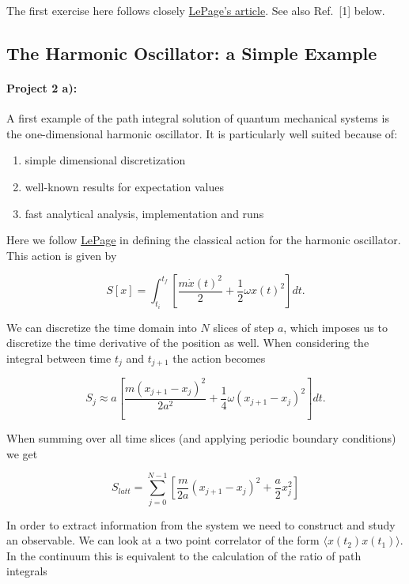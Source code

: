 \documentclass[%
oneside,                 %
final,                   %
10pt]{article}
\begin{document}
The first exercise here follows closely \href{{https://arxiv.org/pdf/hep-lat/0506036.pdf}}{LePage's article}. See also Ref.~[1] below.

\subsection*{The Harmonic Oscillator: a Simple Example}

\paragraph{Project 2 a):}
A first example of the path integral solution of quantum mechanical
systems is the one-dimensional harmonic oscillator. It is particularly
well suited because of:

\begin{enumerate}
\item simple dimensional discretization

\item well-known results for expectation values

\item fast analytical analysis, implementation and runs 
\end{enumerate}

\noindent
Here we follow \href{{https://arxiv.org/pdf/hep-lat/0506036.pdf}}{LePage} in defining
the classical action for the harmonic oscillator. This action is given by

\[
	S[x] = \int_{t_i}^{t_f} \left[ \frac{m\dot{x}(t)^2}{2} + \frac{1}{2}\omega x(t)^2\right] dt.
\]

We can discretize the time domain into $N$ slices of step $a$, which
imposes us to discretize the time derivative of the position as
well. When considering the integral between time $t_j$ and $t_{j+1}$
the action becomes

\[
	S_{j} \approx a\left[ \frac{m(x_{j+1}-x_j)^2}{2a^2} + \frac{1}{4}\omega (x_{j+1} - x_j)^2 \right] dt.
\]

When summing over all time slices (and applying periodic boundary conditions) we get

\[	
	S_{latt} = \sum_{j = 0}^{N-1} \left[ \frac{m}{2a}(x_{j+1}-x_j)^2 + \frac{a}{2} x_j^2 \right]
\]

In order to extract information from the system we need to construct
and study an observable. We can look at a two point correlator of the
form $\langle x(t_2)x(t_1) \rangle$.  In the continuum this is
equivalent to the calculation of the ratio of path integrals
\end{document}
